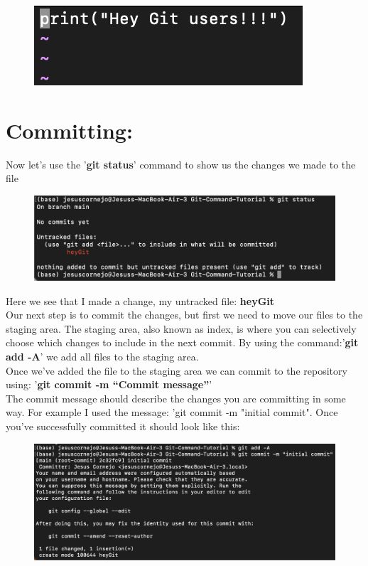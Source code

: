 \documentclass{article}
\begin{document}
\begin{figure}[h]
\includegraphics[scale = 1]{screenshots/sc4.png}
\centering
\end{figure}

\newpage

\section{Committing:}
Now let's use the '\textbf{git status}' command to show us the changes we made to the file

\begin{figure}[h]
\includegraphics[scale = 1]{screenshots/sc5.png}
\centering
\end{figure}

Here we see that I made a change, my untracked file: \textbf{heyGit}\\
Our next step is to commit the changes, but first we need to move our files to the staging area. The staging area, also known as index, is where you can selectively choose which changes to include in the next commit. By using the command:'\textbf{git add -A}' we add all files to the staging area.\\
Once we've added the file to the staging area we can commit to the repository using: '\textbf{git commit -m “Commit message”}'\\
The commit message should describe the changes you are committing in some way. For example I used the message: 'git commit -m "initial commit". Once you’ve successfully committed it should look like this:

\begin{figure}[h]
\includegraphics[scale = 1]{screenshots/sc6.png}
\centering
\end{figure}
\end{document}
